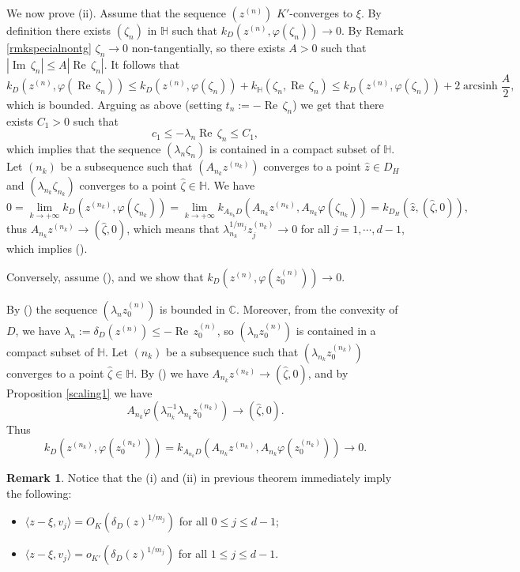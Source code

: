 \documentclass[11pt, reqno]{amsart}
\numberwithin{equation}{section}
\theoremstyle{definition}
\newtheorem{remark}[theorem]{Remark}
\DeclareMathOperator{\arcsinh}{arcsinh}
\newcommand{\C}{\mathbb{C}}
\renewcommand{\H}{\mathbb{H}}
\renewcommand{\Im}{{\operatorname{Im}\,}}
\renewcommand{\Re}{{\operatorname{Re}\,}}
\begin{document}
{	We now prove (ii).
	Assume that the sequence $(z^{(n)})$ $K'$-converges to $\xi$. By definition there exists $(\zeta_n)$ in $\H$ such that $k_D(z^{(n)},\varphi( \zeta_n))\to0$. 
	By Remark \ref{rmkspecialnontg} $\zeta_n\to 0$ non-tangentially, so there exists $A>0$ such that $|\Im\zeta_n|\leq A|\Re\zeta_n|$. It follows that
	$$k_D(z^{(n)},\varphi(\Re\zeta_n))\leq k_D(z^{(n)},\varphi(\zeta_n))+k_{\H}(\zeta_n,\Re \zeta_n)\leq k_D(z^{(n)},\varphi(\zeta_n))+2\arcsinh\frac{A}{2},$$ which is bounded. Arguing as above (setting $t_n:=-\Re\zeta_n$) we get that there exists $C_1>0$ such that 
	$$c_1\leq-\lambda_n\Re\zeta_n\leq C_1,$$ which implies that  the sequence $(\lambda_n\zeta_n)$ is contained in a compact subset of  $\H$.
	Let $(n_k)$ be a subsequence such that $(A_{n_k}z^{(n_k)})$ converges to a point $\hat z\in D_H$ and   $(\lambda_{n_k}\zeta_{n_k})$ converges to a point $\hat\zeta\in \H.$
	We have
	$$0=\lim_{k\to+\infty}k_D(z^{(n_k)},\varphi(\zeta_{n_k}))=\lim_{k\to+\infty}k_{A_{n_k}D}(A_{n_k}z^{(n_k)},A_{n_k}\varphi(\zeta_{n_k}))=k_{D_H}(\hat z,(\hat\zeta,0)),$$
	thus $A_{n_k}z^{(n_k)}\to (\hat\zeta,0)$, which means that 
	$\lambda_{n_k}^{1/m_j}z^{(n_k)}_j\to0$ for all $j=1,\cdots,d-1$,
	which implies ().
	
	Conversely, assume (), and we show that  $k_D(z^{(n)},\varphi(z^{(n)}_0))\to 0$.
	{By () the sequence $(\lambda_n z_0^{(n)})$ is bounded in $\C$. Moreover,  from   the convexity of $D$, we have $\lambda_n:=\delta_D(z^{(n)})\leq -\Re z_0^{(n)}$, so $(\lambda_nz^{(n)}_0)$ is contained in a compact subset of $\H$. Let $(n_k)$ be a subsequence such that $(\lambda_{n_k}z^{(n_k)}_0)$ converges to a point  $\hat\zeta\in \H.$
		By () we have  $A_{n_k}z^{(n_k)}\to (\hat\zeta,0)$, and
		by Proposition \ref{scaling1} we have
		$$A_{n_k}\varphi(\lambda_{n_k}^{-1}\lambda_{n_k}z_0^{(n_k)})\to (\hat\zeta,0).$$
		Thus
		$$k_D(z^{(n_k)},\varphi(z^{(n_k)}_0))=k_{A_{n_k}D}(A_{n_k}z^{(n_k)},A_{n_k}\varphi(z^{(n_k)}_0))\to 0.$$
		
		
		\endproof
		
		\begin{remark}\label{reformulation}
			Notice that the (i) and (ii) in previous theorem immediately imply the following:
			\begin{itemize}
				\item[(i)]  $\langle z-\xi,v_j\rangle=O_K\left(\delta_D(z)^{1/m_j}\right)$ for all  $0\leq j\leq d-1$;
				\item[(ii)] $\langle z-\xi,v_j\rangle=o_{K'}\left(\delta_D(z)^{1/m_j}\right)$ for all $1\leq j\leq d-1$.
			\end{itemize}
		\end{remark}
		
}}
\end{document}
